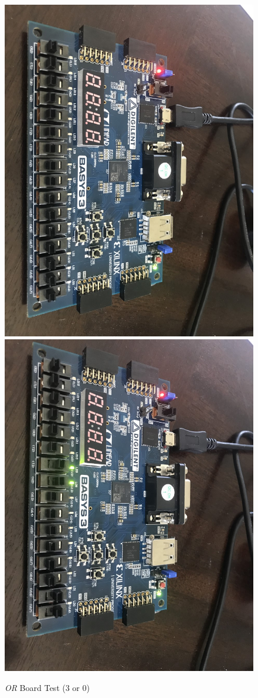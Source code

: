 \documentclass[11pt]{article}
\begin{document}
\begin{figure}[ht]\centering
	\includegraphics[angle=90, width=.8\textwidth]{or1}
	\includegraphics[angle=90, width=.8\textwidth]{or2}
	\caption{\textit{OR} Board Test (3 or 0)}
	\label{fig:sim_with_table}
\end{figure}
\end{document}
